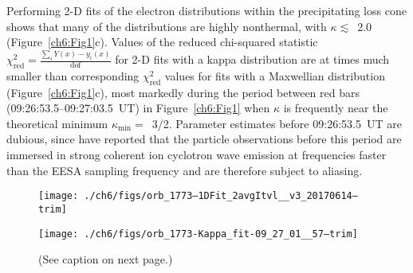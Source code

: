   Performing 2-D fits of the electron distributions within the precipitating
  loss cone shows that many of the distributions are highly nonthermal, with
  $\kappa \lesssim$~2.0 (Figure~\ref{ch6:Fig1}c). Values of the reduced
  chi-squared statistic
  $\chi^2_{\mathrm{red}} = \frac{\sum_i Y(x) - y_i(x)}{\mathrm{dof}}$ for 2-D
  fits with a kappa distribution are at times much smaller than corresponding
  $\chi^2_{\textrm{red}}$ values for fits with a Maxwellian distribution
  (Figure~\ref{ch6:Fig1}c), most markedly during the period between red bars
  (09:26:53.5--09:27:03.5~UT) in Figure~\ref{ch6:Fig1} when $\kappa$ is frequently
  near the theoretical minimum $\kappa_{\mathrm{min}} =$~3/2. Parameter
  estimates before 09:26:53.5~UT are dubious, since \citet{Chaston2002b} have
  reported that the particle observations before this period are immersed in
  strong coherent ion cyclotron wave emission at frequencies faster than the
  EESA sampling frequency and are therefore subject to aliasing.


  \begin{figure}
    \centering


    \noindent\texttt{[image: ./ch6/figs/orb\_1773--1DFit\_2avgItvl\_\_v3\_20170614--trim]}

    \vspace{1cm}

    \noindent\texttt{[image: ./ch6/figs/orb\_1773-Kappa\_fit-09\_27\_01\_\_57--trim]}

    \caption[Example one- and two-dimensional fits of observed inverted-V
    electron distributions (Orbit 1773)]{(See caption on next page.)}
    \label{ch6:Fig2}
  \end{figure}

